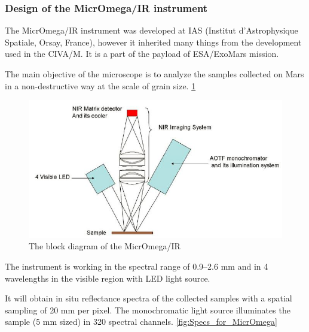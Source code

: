 \subsubsection{Design of the MicrOmega/IR instrument} 

The MicrOmega/IR instrument was developed at IAS (Institut d'Astrophysique Spatiale, Orsay, France), however it inherited many things from the development used in the CIVA/M. It is a part of the payload of ESA/ExoMars mission. 

The main objective of the microscope is to analyze the samples collected on Mars in a non-destructive way at the scale of grain size.
\ref{fig:Block_diagram}

\begin{figure}[htb]
  \centering
  \includegraphics[scale=0.8]{figures/BFfig/Block_diagram}
  \caption{The block diagram of the MicrOmega/IR}
  \label{fig:Block_diagram}
\end{figure}

The instrument is working in the spectral range of 0.9–2.6 mm and in 4 wavelengths in the visible region with LED light source.
\cite{Leroi20091068}

It will obtain in situ reflectance spectra of the collected samples with a spatial sampling of 20 mm per pixel. The monochromatic light source illuminates the sample (5 mm sized) in 320 spectral channels.
\ref{fig:Specs_for_MicrOmega}

